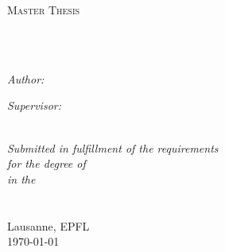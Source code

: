 \documentclass[
11pt, %
chapterinoneline,%
english, %
singlespacing, %
parskip, %
headsepline, %
]{MastersDoctoralThesis} %
\author{Sidney \textsc{Bovet}} %
\begin{document}
\frontmatter %

\pagestyle{plain} %


\begin{titlepage}
\begin{center}

{\scshape\LARGE \univname\par}\vspace{1.5cm} %
\textsc{\Large Master Thesis}\\[0.5cm] %

\HRule \\[0.4cm] %
{\huge \bfseries \ttitle\par}\vspace{0.4cm} %
\HRule \\[1.5cm] %

\begin{minipage}[t]{0.4\textwidth}
\begin{flushleft} \large
\emph{Author:}\\
{\authorname} %
\end{flushleft}
\end{minipage}
\begin{minipage}[t]{0.4\textwidth}
\begin{flushright} \large
\emph{Supervisor:} \\
{\supname} %
\end{flushright}
\end{minipage}\\[3cm]

\large \textit{Submitted in fulfillment of the requirements\\ for the degree of \degreename}\\[0.3cm] %
\textit{in the}\\[0.4cm]
\groupname\\\deptname\\[2cm] %

{\large Lausanne, EPFL \\[0.3cm] \today}\\[4cm] %

\vfill
\end{center}
\end{titlepage}
\end{document}
